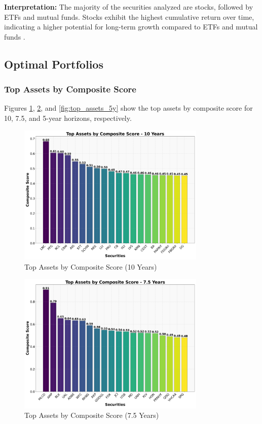 \textbf{Interpretation:} The majority of the securities analyzed are stocks, followed by ETFs and mutual funds. Stocks exhibit the highest cumulative return over time, indicating a higher potential for long-term growth compared to ETFs and mutual funds \citep{markowitz1952portfolio}.

\subsection{Optimal Portfolios}

\subsubsection{Top Assets by Composite Score}
Figures \ref{fig:top_assets_10y}, \ref{fig:top_assets_7_5y}, and \ref{fig:top_assets_5y} show the top assets by composite score for 10, 7.5, and 5-year horizons, respectively.

\begin{figure}[!htbp]
    \centering
    \includegraphics[width=0.8\textwidth]{../Figures/top_assets_composite_score_10_years.png}
    \caption{Top Assets by Composite Score (10 Years)}
    \label{fig:top_assets_10y}
\end{figure}

\begin{figure}[!htbp]
    \centering
    \includegraphics[width=0.8\textwidth]{../Figures/top_assets_composite_score_7_5_years.png}
    \caption{Top Assets by Composite Score (7.5 Years)}
    \label{fig:top_assets_7_5y}
\end{figure}


